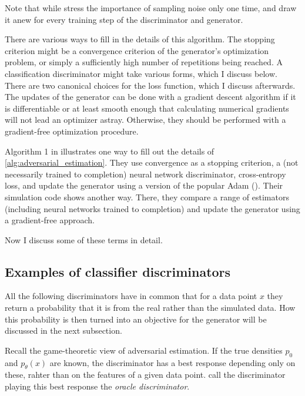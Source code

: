 Note that while \textcite{kaji2023adversarial} stress the importance of sampling noise only one time, \textcite{goodfellow2014generative} and \textcite{athey2021using} draw it anew for every training step of the discriminator and generator.

There are various ways to fill in the details of this algorithm.
The stopping criterion might be a convergence criterion of the generator's optimization problem, or simply a sufficiently high number of repetitions being reached.
A classification discriminator might take various forms, which I discuss below.
There are two canonical choices for the loss function, which I discuss afterwards.
The updates of the generator can be done with a gradient descent algorithm if it is differentiable or at least smooth enough that calculating numerical gradients will not lead an optimizer astray.
Otherwise, they should be performed with a gradient-free optimization procedure.

Algorithm 1 in \textcite{kaji2023adversarial} illustrates one way to fill out the details of \ref{alg:adversarial_estimation}.
They use convergence as a stopping criterion, a (not necessarily trained to completion) neural network discriminator, cross-entropy loss, and update the generator using a version of the popular Adam (\cite{diederik2014adam}).
Their simulation code shows another way. %
There, they compare a range of estimators (including neural networks trained to completion) and update the generator using a gradient-free approach.

Now I discuss some of these terms in detail.

\subsection{Examples of classifier discriminators}
\label{sec:discriminators}
All the following discriminators have in common that for a data point $x$ they return a probability that it is from the real rather than the simulated data.
How this probability is then turned into an objective for the generator will be discussed in the next subsection.

Recall the game-theoretic view of adversarial estimation.
If the true densities $p_0$ and $p_\theta(x)$ are known, the discriminator has a best response depending only on these, rahter than on the features of a given data point.
\textcite{kaji2023adversarial} call the discriminator playing this best response the \textit{oracle discriminator}. %

